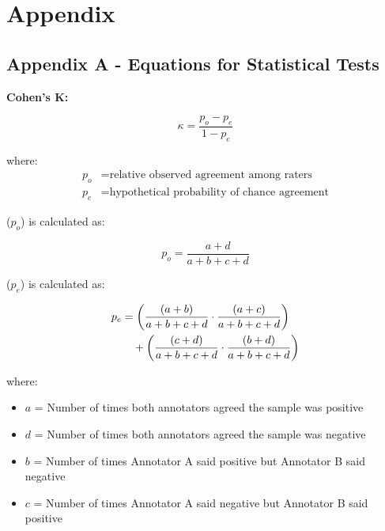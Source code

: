 \documentclass[10.7pt, onecolumn]{article}
\begin{document}



\section{Appendix}

\subsection{Appendix A - Equations for Statistical Tests}


\textbf{Cohen's K:}

\begin{equation}
  \kappa = \frac{p_o - p_e}{1 - p_e}
  \end{equation}
  
  where:
  \begin{align*}
  p_o & = \text{relative observed agreement among raters} \\
  p_e & = \text{hypothetical probability of chance agreement}
  \end{align*}
  
  ($p_o$) is calculated as:
  
  \begin{equation}
  p_o = \frac{a + d}{a + b + c + d}
  \end{equation}
  
  ($p_e$) is calculated as:
  
  \begin{align}
    p_e &= \left(\frac{(a + b)}{a + b + c + d} \cdot \frac{(a + c)}{a + b + c + d}\right) \notag \\
    &\quad + \left(\frac{(c + d)}{a + b + c + d} \cdot \frac{(b + d)}{a + b + c + d}\right)
    \end{align}

  where:
  \begin{itemize}
      \item $a$ = Number of times both annotators agreed the sample was positive
      \item $d$ = Number of times both annotators agreed the sample was negative
      \item $b$ = Number of times Annotator A said positive but Annotator B said negative
      \item $c$ = Number of times Annotator A said negative but Annotator B said positive
  \end{itemize}
\end{document}

